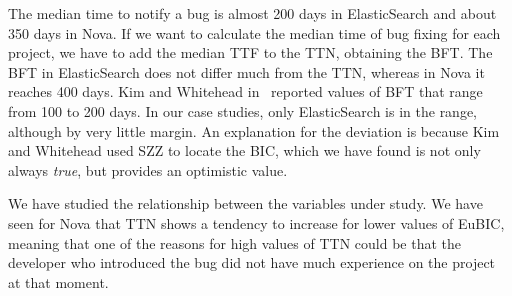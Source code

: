 \documentclass[10pt, conference]{IEEEtran}
\begin{document}
The median time to notify a bug is almost 200 days in ElasticSearch and about 350 days in Nova. If we want to calculate the median time of bug fixing for each project, we have to add the median TTF to the TTN, obtaining the BFT. The BFT in ElasticSearch does not differ much from the TTN, whereas in Nova it reaches 400 days.
Kim and Whitehead in~\cite{kim2006long} reported values of BFT that range from 100 to 200 days. In our case studies, only ElasticSearch is in the range, although by very little margin. An explanation for the deviation is because Kim and Whitehead used SZZ to locate the BIC, which we have found is not only always \emph{true}, but provides an optimistic value.

\vspace{0.2cm}
\vspace{0.1cm}

We have studied the relationship between the variables under study. We have seen for Nova that TTN shows a tendency to increase for lower values of EuBIC, meaning that one of the reasons for high values of TTN could be that the developer who introduced the bug did not have much experience on the project at that moment.

\vspace{0.2cm}
\vspace{0.1cm}
\end{document}
